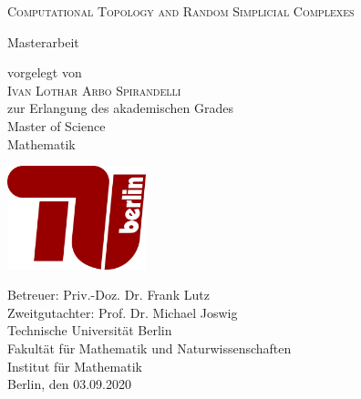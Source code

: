 \begin{titlepage}

\setlength{\hoffset}{.5cm}

 \begin{center}
 
    \large
    
    \renewcommand{\baselinestretch}{2}\normalsize
    
    {\huge \scshape Computational Topology and Random Simplicial Complexes}
    
    \renewcommand{\baselinestretch}{1}\normalsize
    
    \vspace*{.7cm}
    
    \huge{Masterarbeit}
    
    \vspace*{.7cm}
    
    \Large
    vorgelegt von\\
    \vspace*{.5cm}
     \huge{{\scshape Ivan Lothar Arbo Spirandelli}} \\
     \vspace*{.5cm}
    \Large
    zur Erlangung des akademischen Grades \\
  \vspace*{.5cm}
    \huge{Master of Science\\Mathematik}	
    
   
    
    \vspace*{.5cm}
    \large    
    \vspace*{1cm}
   \includegraphics[height=3cm]{TUBerlin_Logo_rot}
    \vspace*{1cm}
    
    Betreuer: Priv.-Doz. Dr. Frank Lutz \\[1ex]
    Zweitgutachter: Prof. Dr. Michael Joswig \\[3ex]
    
   Technische Universit\"at Berlin\\
   
   Fakult\"at f\"ur Mathematik und Naturwissenschaften\\
   
   Institut f\"ur Mathematik\\[7ex]
   
       Berlin, den 03.09.2020
   
  \end{center}
\end{titlepage}
\newpage
\thispagestyle{empty}
\qquad

